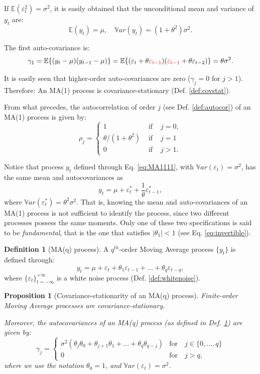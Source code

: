\documentclass[
  11pt,
]{book}
\newtheorem{proposition}{Proposition}[chapter]
\theoremstyle{definition}
\newtheorem{definition}{Definition}[chapter]
\theoremstyle{definition}
\theoremstyle{definition}
\theoremstyle{definition}
\theoremstyle{remark}
\begin{document}
If \(\mathbb{E}(\varepsilon_t^2)=\sigma^2\), it is easily obtained that the unconditional mean and variance of \(y_t\) are:
\[
\mathbb{E}(y_t) = \mu, \quad \mathbb{V}ar(y_t) = (1+\theta^2)\sigma^2.
\]

The first auto-covariance is:
\[
\gamma_1=\mathbb{E}\{(y_t - \mu)(y_{t-1} - \mu)\}=\mathbb{E}\{(\varepsilon_t + \theta {\color{red}\varepsilon_{t-1}})({\color{red}\varepsilon_{t-1}} + \theta \varepsilon_{t-2})\} = \theta \sigma^2.
\]

It is easily seen that higher-order auto-covariances are zero (\(\gamma_j=0\) for \(j>1\)). Therefore: An MA(1) process is covariance-stationary (Def. \ref{def:covstat}).

From what precedes, the autocorrelation of order \(j\) (see Def. \ref{def:autocor}) of an MA(1) process is given by:
\[
\rho_j =
\left\{
\begin{array}{lll}
1 &\mbox{ if }& j=0,\\
\theta / (1 + \theta^2) &\mbox{ if }& j = 1\\
0 &\mbox{ if }& j>1.
\end{array}
\right.
\]

Notice that process \(y_t\) defined through Eq. \eqref{eq:MA1111}, with \(\mathbb{V}ar(\varepsilon_t)=\sigma^2\), has the same mean and autocovariances as
\[
y_t = \mu + \varepsilon^*_t +\frac{1}{\theta}\varepsilon^*_{t-1},
\]
where \(\mathbb{V}ar(\varepsilon^*_t)=\theta^2\sigma^2\). That is, knowing the mean and auto-covariances of an MA(1) process is not sufficient to identify the process, since two different processes possess the same moments. Only one of these two specifications is said to be \emph{fundamental}, that is the one that satisfies \(|\theta_1|<1\) (see Eq. \eqref{eq:invertible}).

\begin{definition}[MA(q) process]
\protect\hypertarget{def:MAq}{}\label{def:MAq}A \(q^{th}\)-order Moving Average process \(\{y_t\}\) is defined through:
\[
y_t = \mu + \varepsilon_t + \theta_1 \varepsilon_{t-1} + \dots + \theta_q \varepsilon_{t-q},
\]
where \(\{\varepsilon_t\}_{t = -\infty}^{+\infty}\) is a white noise process (Def. \ref{def:whitenoise}).
\end{definition}

\begin{proposition}[Covariance-stationarity of an MA(q) process]
\protect\hypertarget{prp:covMAq}{}\label{prp:covMAq}Finite-order Moving Average processes are covariance-stationary.

Moreover, the autocovariances of an MA(q) process (as defined in Def. \ref{def:MAq}) are given by:
\begin{equation}
\gamma_j = \left\{ \begin{array}{ll} \sigma^2(\theta_j\theta_0 + \theta_{j+1}\theta_{1} +  \dots + \theta_{q}\theta_{q-j}) &\mbox{for} \quad j \in \{0,\dots,q\} \\ 0 &\mbox{for} \quad j>q, \end{array} \right.\label{eq:autocovMA}
\end{equation}
where we use the notation \(\theta_0=1\), and \(\mathbb{V}ar(\varepsilon_t)=\sigma^2\).
\end{proposition}
\end{document}
